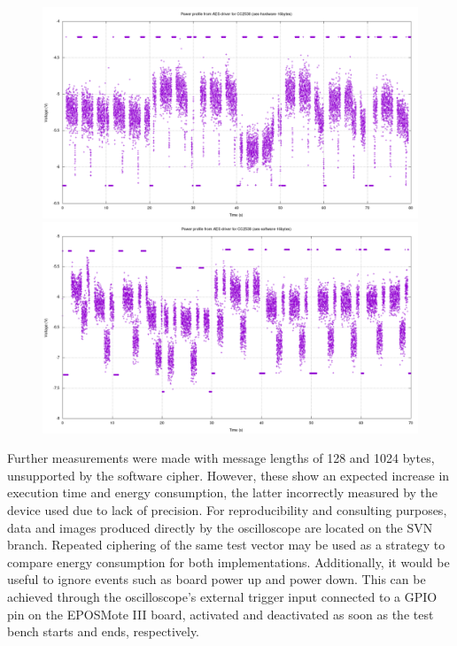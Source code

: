 \documentclass{../sftex/sftex}
\begin{document}
\begin{figure}[ht]
  \centering
  \includegraphics[width=\textwidth]{support/aes-hardware-16bytes.png}
  \includegraphics[width=\textwidth]{support/aes-software-16bytes.png}
\end{figure}

Further measurements were made with message lengths of 128 and 1024 bytes,
unsupported by the software cipher. However, these show an expected increase in
execution time and energy consumption, the latter incorrectly measured by the
device used due to lack of precision. For reproducibility and consulting
purposes, data and images produced directly by the oscilloscope are located on
the SVN branch. Repeated ciphering of the same test vector may be used as a
strategy to compare energy consumption for both implementations. Additionally,
it would be useful to ignore events such as board power up and power down. This
can be achieved through the oscilloscope's external trigger input connected to
a GPIO pin on the EPOSMote III board, activated and deactivated as soon as the
test bench starts and ends, respectively.



\end{document}
